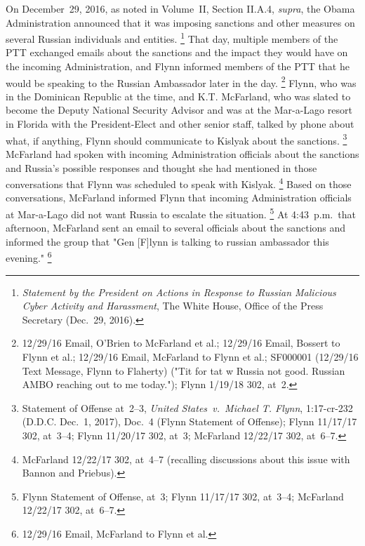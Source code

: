 On December~29, 2016, as noted in Volume~II, Section II.A.4, \textit{supra}, the Obama Administration announced that it was imposing sanctions and other measures on several Russian individuals and entities.%
\footnote{\textit{Statement by the President on Actions in Response to Russian Malicious Cyber Activity and Harassment}, The White House, Office of the Press Secretary (Dec.~29, 2016).}
That day, multiple members of the PTT exchanged emails about the sanctions and the impact they would have on the incoming Administration, and Flynn informed members of the PTT that he would be speaking to the Russian Ambassador later in the day.%
\footnote{12/29/16 Email, O'Brien to McFarland et al.;
12/29/16 Email, Bossert to Flynn et al.;
12/29/16 Email, McFarland to Flynn et al.;
SF000001 (12/29/16 Text Message, Flynn to Flaherty) ("Tit for tat w Russia not good. Russian AMBO reaching out to me today.");
Flynn 1/19/18 302, at~2.}
Flynn, who was in the Dominican Republic at the time, and K.T. McFarland, who was slated to become the Deputy National Security Advisor and was at the Mar-a-Lago resort in Florida with the President-Elect and other senior staff, talked by phone about what, if anything, Flynn should communicate to Kislyak about the sanctions.%
\footnote{Statement of Offense at~2--3, \textit{United States~v.\ Michael T. Flynn}, 1:17-cr-232 (D.D.C. Dec.~1, 2017), Doc.~4 (Flynn Statement of Offense);
Flynn 11/17/17 302, at~3--4;
Flynn 11/20/17 302, at~3;
McFarland 12/22/17 302, at~6--7.}
McFarland had spoken with incoming Administration officials about the sanctions and Russia's possible responses and thought she had mentioned in those conversations that Flynn was scheduled to speak with Kislyak.%
\footnote{McFarland 12/22/17 302, at~4--7 (recalling discussions about this issue with Bannon and Priebus).}
Based on those conversations, McFarland informed Flynn that incoming Administration officials at Mar-a-Lago did not want Russia to escalate the situation.%
\footnote{Flynn Statement of Offense, at~3;
Flynn 11/17/17 302, at~3--4;
McFarland 12/22/17 302, at~6--7.}
At 4:43~p.m.\ that afternoon, McFarland sent an email to several officials about the sanctions and informed the group that "Gen [F]lynn is talking to russian ambassador this evening."%
\footnote{12/29/16 Email, McFarland to Flynn et al.}

